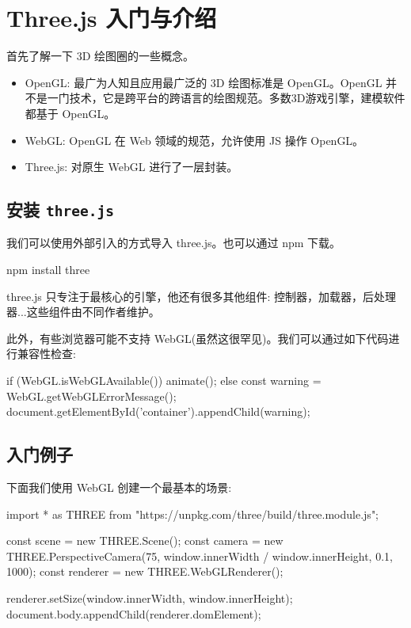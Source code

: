 \section{Three.js 入门与介绍}

首先了解一下 3D 绘图圈的一些概念。
\begin{itemize}
  \item OpenGL: 最广为人知且应用最广泛的 3D 绘图标准是 OpenGL。OpenGL 并不是一门技术，它是跨平台的跨语言的绘图规范。多数3D游戏引擎，建模软件都基于 OpenGL。
  \item WebGL: OpenGL 在 Web 领域的规范，允许使用 JS 操作 OpenGL。
  \item Three.js: 对原生 WebGL 进行了一层封装。
\end{itemize}

\subsection{安装 \texttt{three.js}}

我们可以使用外部引入的方式导入 three.js。也可以通过 npm 下载。

\begin{bash}
npm install three
\end{bash}

three.js 只专注于最核心的引擎，他还有很多其他组件: 控制器，加载器，后处理器...这些组件由不同作者维护。

此外，有些浏览器可能不支持 WebGL(虽然这很罕见)。我们可以通过如下代码进行兼容性检查:

\begin{JavaScript}
if (WebGL.isWebGLAvailable()) {
  animate();
} else {
  const warning = WebGL.getWebGLErrorMessage();
  document.getElementById('container').appendChild(warning);
}
\end{JavaScript}

\subsection{入门例子}

下面我们使用 WebGL 创建一个最基本的场景:

\begin{JavaScript}
import * as THREE from "https://unpkg.com/three/build/three.module.js";

const scene = new THREE.Scene();
const camera = new THREE.PerspectiveCamera(75, window.innerWidth / window.innerHeight, 0.1, 1000);
const renderer = new THREE.WebGLRenderer();

renderer.setSize(window.innerWidth, window.innerHeight);
document.body.appendChild(renderer.domElement);
\end{JavaScript}

